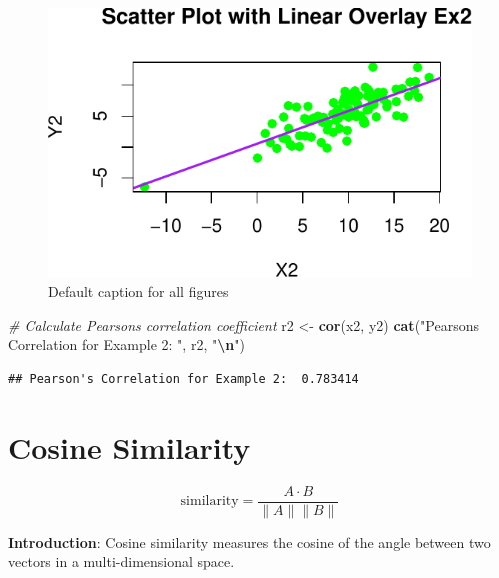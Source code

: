 \documentclass[
  12 pt,
  a4paper,
]{book}
\newenvironment{Shaded}{\begin{snugshade}}{\end{snugshade}}
\newcommand{\CommentTok}[1]{\textcolor[rgb]{0.56,0.35,0.01}{\textit{#1}}}
\newcommand{\FunctionTok}[1]{\textcolor[rgb]{0.13,0.29,0.53}{\textbf{#1}}}
\newcommand{\NormalTok}[1]{#1}
\newcommand{\OtherTok}[1]{\textcolor[rgb]{0.56,0.35,0.01}{#1}}
\newcommand{\SpecialCharTok}[1]{\textcolor[rgb]{0.81,0.36,0.00}{\textbf{#1}}}
\newcommand{\StringTok}[1]{\textcolor[rgb]{0.31,0.60,0.02}{#1}}
\numberwithin{equation}{section}
\theoremstyle{plain}      %
\theoremstyle{definition} %
\theoremstyle{remark}     %
\theoremstyle{note}         %
\begin{document}
\begin{figure}[h]

{\centering \includegraphics{25MLEqs-V0.0_files/figure-latex/example2-1} 

}

\caption{Default caption for all figures}\label{fig:example2}
\end{figure}

\begin{Shaded}
\begin{Highlighting}[]
\CommentTok{\# Calculate Pearson\textquotesingle{}s correlation coefficient}
\NormalTok{r2 }\OtherTok{\textless{}{-}} \FunctionTok{cor}\NormalTok{(x2, y2)}
\FunctionTok{cat}\NormalTok{(}\StringTok{"Pearson\textquotesingle{}s Correlation for Example 2: "}\NormalTok{, r2, }\StringTok{"}\SpecialCharTok{\textbackslash{}n}\StringTok{"}\NormalTok{)}
\end{Highlighting}
\end{Shaded}

\begin{verbatim}
## Pearson's Correlation for Example 2:  0.783414
\end{verbatim}

\newpage

\hypertarget{cosine-similarity}{%
\chapter{Cosine Similarity}\label{cosine-similarity}}

\[
\text{similarity} = \frac{A \cdot B}{\|A\| \|B\|}
\]

\textbf{Introduction}: Cosine similarity measures the cosine of the
angle between two vectors in a multi-dimensional space.
\end{document}
